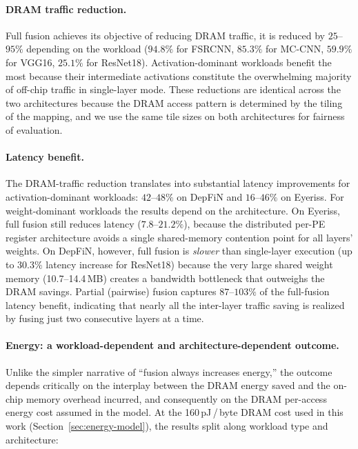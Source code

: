 \paragraph{DRAM traffic reduction.}
Full fusion achieves its objective of reducing DRAM traffic, it is reduced
by $25$--$95\%$ depending on the workload ($94.8\%$ for FSRCNN,
$85.3\%$ for MC-CNN, $59.9\%$ for VGG16, $25.1\%$ for ResNet18).
Activation-dominant workloads benefit the most because their
intermediate activations constitute the overwhelming majority of
off-chip traffic in single-layer mode.
These reductions are identical across the two architectures because
the DRAM access pattern is determined by the tiling of the mapping,
and we use the same tile sizes on both architectures for fairness
of evaluation.

\paragraph{Latency benefit.}
The DRAM-traffic reduction translates into substantial latency
improvements for activation-dominant workloads: $42$--$48\%$ on
DepFiN and $16$--$46\%$ on Eyeriss.
For weight-dominant workloads the results depend on the
architecture.
On Eyeriss, full fusion still reduces latency ($7.8$--$21.2\%$),
because the distributed per-PE register architecture avoids a
single shared-memory contention point for all layers' weights.
On DepFiN, however, full fusion is \emph{slower} than single-layer
execution (up to $30.3\%$ latency increase for ResNet18) because
the very large shared weight memory (10.7--14.4\,MB) creates a
bandwidth bottleneck that outweighs the DRAM savings.
Partial (pairwise) fusion captures $87$--$103\%$ of the full-fusion
latency benefit, indicating that nearly all the inter-layer traffic
saving is realized by fusing just two consecutive layers at a time.

\paragraph{Energy: a workload-dependent and architecture-dependent outcome.}
Unlike the simpler narrative of ``fusion always increases energy,''
the outcome depends critically on the interplay between the DRAM
energy saved and the on-chip memory overhead incurred, and
consequently on the DRAM per-access energy cost assumed in the
model.
At the 160\,pJ\,/\,byte DRAM cost used in this work
(Section~\ref{sec:energy-model}), the results split along workload
type and architecture:


